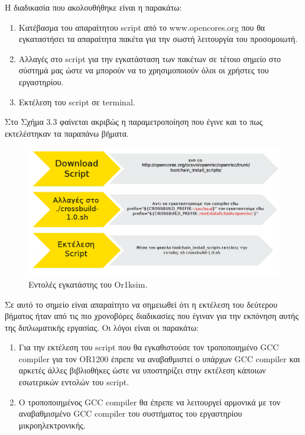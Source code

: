 \documentclass[a4paper,10pt]{article}
\numberwithin{figure}{section}
\numberwithin{table}{section}
\begin{document}
Η διαδικασία που ακολουθήθηκε είναι η παρακάτω:
\begin{enumerate}
 \item Κατέβασμα του απαραίτητου script από το www.opencores.org που θα εγκαταστήσει τα απαραίτητα πακέτα για την σωστή λειτουργία του προσομοιωτή.
 \item Αλλαγές στο script για την εγκατάσταση των πακέτων σε τέτοιο σημείο στο σύστημά μας ώστε να μπορούν να το χρησιμοποιούν όλοι οι χρήστες του εργαστηρίου.
 \item Εκτέλεση του script σε terminal.
\end{enumerate}


Στο Σχήμα 3.3 φαίνεται ακριβώς η παραμετροποίηση που έγινε και το πως εκτελέστηκαν τα παραπάνω βήματα.
\vspace{0.7cm}
\begin{figure}[h!]
 \centering
 \includegraphics[bb=0 0 1065 546,scale=0.31]{./Images/or1ksim.png}
 \caption{Εντολές εγκατάστης του Or1ksim.}
\end{figure}
\vspace{0.7cm}

\newpage

Σε αυτό το σημείο είναι απαραίτητο να σημειωθεί ότι η εκτέλεση του δεύτερου βήματος ήταν από τις πιο χρονοβόρες διαδικασίες που έγιναν για την εκπόνηση αυτής της διπλωματικής εργασίας. 
Οι λόγοι είναι οι παρακάτω:
\begin{enumerate}
 \item Για την εκτέλεση του script που θα εγκαθιστούσε τον τροποποιημένο GCC compiler για τον OR1200 έπρεπε να αναβαθμιστεί ο υπάρχων GCC compiler και αρκετές άλλες βιβλιοθήκες ώστε να υποστηρίζει στην εκτέλεση κάποιων εσωτερικών εντολών του script. 
 \item Ο τροποποιημένος GCC compiler θα έπρεπε να λειτουργεί αρμονικά με τον αναβαθμισμένο GCC compiler του συστήματος του εργαστηρίου μικροηλεκτρονικής.
\end{enumerate}
\end{document}
